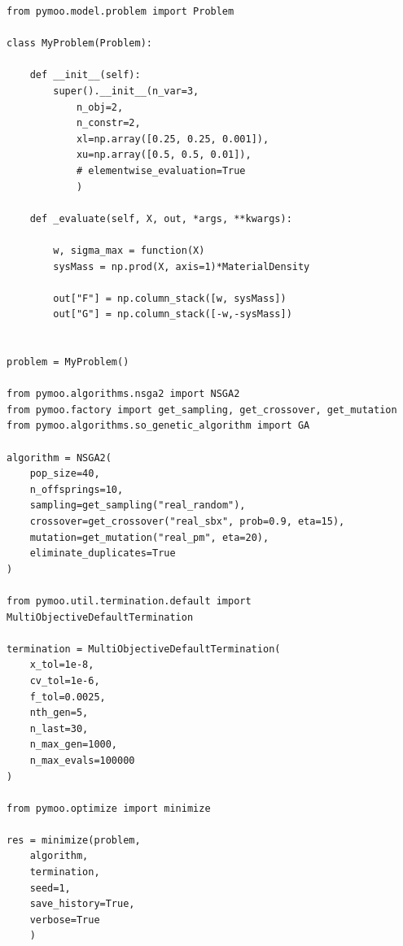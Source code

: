 \documentclass[a4paper,12pt]{article}
\begin{document}
\begin{verbatim}
from pymoo.model.problem import Problem

class MyProblem(Problem):

	def __init__(self):
		super().__init__(n_var=3, 
			n_obj=2,
			n_constr=2,
			xl=np.array([0.25, 0.25, 0.001]),
			xu=np.array([0.5, 0.5, 0.01]),
			# elementwise_evaluation=True
			)

	def _evaluate(self, X, out, *args, **kwargs):

		w, sigma_max = function(X) 
		sysMass = np.prod(X, axis=1)*MaterialDensity

		out["F"] = np.column_stack([w, sysMass])
		out["G"] = np.column_stack([-w,-sysMass])


problem = MyProblem()

from pymoo.algorithms.nsga2 import NSGA2
from pymoo.factory import get_sampling, get_crossover, get_mutation
from pymoo.algorithms.so_genetic_algorithm import GA

algorithm = NSGA2(
	pop_size=40,
	n_offsprings=10,
	sampling=get_sampling("real_random"),
	crossover=get_crossover("real_sbx", prob=0.9, eta=15),
	mutation=get_mutation("real_pm", eta=20),
	eliminate_duplicates=True
)

from pymoo.util.termination.default import MultiObjectiveDefaultTermination

termination = MultiObjectiveDefaultTermination(
    x_tol=1e-8,
    cv_tol=1e-6,
    f_tol=0.0025,
    nth_gen=5,
    n_last=30,
    n_max_gen=1000,
    n_max_evals=100000
)

from pymoo.optimize import minimize

res = minimize(problem, 
	algorithm, 
	termination, 
	seed=1, 
	save_history=True, 
	verbose=True
	)
\end{verbatim}





\end{document}
